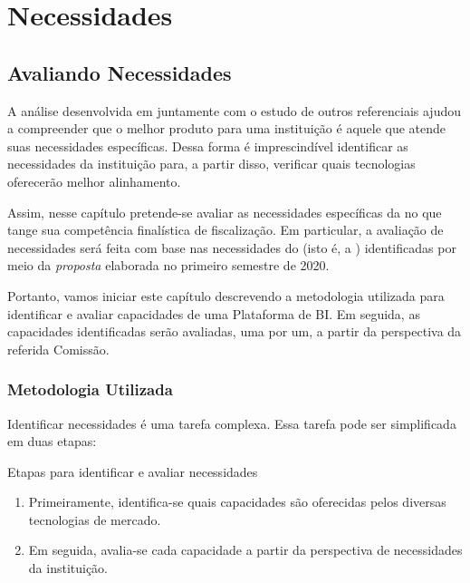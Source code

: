 \part{Necessidades}
\label{parte-necessidades}

\chapter{Avaliando Necessidades}
\label{cap-necessidades}

A análise desenvolvida em \cite[7]{analisegartner2020} juntamente com o estudo de outros referenciais ajudou a compreender que o melhor produto para uma instituição é aquele que atende suas necessidades específicas. Dessa forma é imprescindível identificar as necessidades da instituição para, a partir disso, verificar quais tecnologias oferecerão melhor alinhamento. 

Assim, nesse capítulo pretende-se avaliar as necessidades específicas da \CLDF no que tange sua competência finalística de fiscalização. Em particular, a avaliação de necessidades será feita com base nas necessidades do \CLIENTE \xspace(isto é, a \CDDHCEDP) identificadas por meio da \emph{proposta} elaborada no primeiro semestre de 2020.

Portanto, vamos iniciar este capítulo descrevendo a metodologia utilizada para identificar e avaliar capacidades de uma Plataforma de BI. Em seguida, as capacidades identificadas serão avaliadas, uma por um, a partir da perspectiva da referida Comissão.

\section{Metodologia Utilizada}
\label{sec-metodologia}

Identificar necessidades é uma tarefa complexa. Essa tarefa pode ser simplificada em duas etapas:

    \begin{env-destaque}{Etapas para identificar e avaliar necessidades}

    \begin{enumerate}
        \item Primeiramente, identifica-se quais capacidades são oferecidas pelos diversas tecnologias de mercado.
        
        \item Em seguida, avalia-se cada capacidade a partir da perspectiva de necessidades da instituição.
    \end{enumerate}

    \end{env-destaque}

